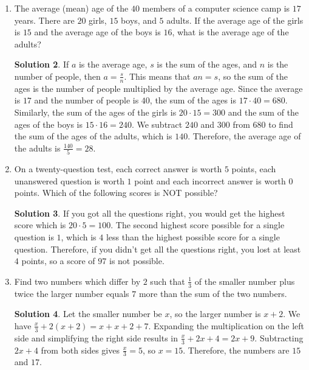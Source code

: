 \documentclass{article}
\theoremstyle{definition}
\newtheorem*{solution}{Solution}
\begin{document}
\begin{enumerate}
\begin{solution}
        \end{solution}
        \item The average (mean) age of the $40$ members of a computer science camp is $17$ years. There are $20$ girls, $15$ boys, and $5$ adults. If the average age of the girls is $15$ and the average age of the boys is $16$, what is the average age of the adults?
        \begin{solution}
            If $a$ is the average age, $s$ is the sum of the ages, and $n$ is the number of people, then $a = \frac{s}{n}$. This means that $an = s$, so the sum of the ages is the number of people multiplied by the average age. Since the average is $17$ and the number of people is $40$, the sum of the ages is $17 \cdot 40 = 680$. Similarly, the sum of the ages of the girls is $20 \cdot 15 = 300$ and the sum of the ages of the boys is $15 \cdot 16 = 240$. We subtract $240$ and $300$ from $680$ to find the sum of the ages of the adults, which is $140$. Therefore, the average age of the adults is $\frac{140}{5} = 28$.
        \end{solution}
        \item On a twenty-question test, each correct answer is worth $5$ points, each unanswered question is worth $1$ point and each incorrect answer is worth $0$ points. Which of the following scores is NOT possible?
        \begin{solution}
            If you got all the questions right, you would get the highest score which is $20 \cdot 5 = 100$. The second highest score possible for a single question is $1$, which is $4$ less than the highest possible score for a single question. Therefore, if you didn't get all the questions right, you lost at least $4$ points, so a score of $97$ is not possible.
        \end{solution}
        \item Find two numbers which differ by $2$ such that $\frac{1}{3}$ of the smaller number plus twice the larger number equals $7$ more than the sum of the two numbers.
        \begin{solution}
            Let the smaller number be $x$, so the larger number is $x + 2$. We have $\frac{x}{3} + 2(x + 2) = x + x + 2 + 7$. Expanding the multiplication on the left side and simplifying the right side results in $\frac{x}{3} + 2x + 4 = 2x + 9$. Subtracting $2x + 4$ from both sides gives $\frac{x}{3} = 5$, so $x = 15$. Therefore, the numbers are $15$ and $17$.
        \end{solution}
    \end{enumerate}
\end{document}

